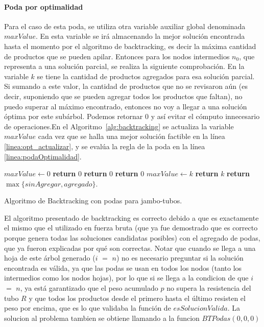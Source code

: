 \documentclass[10pt,a4paper]{article}
\begin{document}
\paragraph{Poda por optimalidad}
Para el caso de esta poda, se utiliza otra variable auxiliar global denominada $maxValue$. En esta variable se irá almacenando la mejor solución encontrada hasta el momento por el algoritmo de backtracking, es decir la máxima cantidad de productos que se pueden apilar. Entonces para los nodos intermedios $n_0$, que representa a una solución parcial, se realiza la siguiente comprobación. En la variable $k$ se tiene la cantidad de productos agregados para esa solución parcial. Si sumando a este valor, la cantidad de productos que no se revisaron aún (es decir, suponiendo que se pueden agregar todos los productos que faltan), no puedo superar al máximo encontrado, entonces no voy a llegar a una solución óptima por este subárbol. Podemos retornar 0 y así evitar el cómputo innecesario de operaciones.En el Algoritmo~\ref{alg:backtracking} se actualiza la variable $maxValue$ cada vez que se halla una mejor solución factible en la línea \ref{linea:opt_actualizar}, y se evalúa la regla de la poda en la línea \ref{linea:podaOptimalidad}.

\begin{algorithm}
\begin{algorithmic}[1]
\State $maxValue \gets 0$
   {\textbf{return} $0$}
   \EndIf \label{linea:podaFactibilidad1}
   {\textbf{return} $0$}
   \EndIf \label{linea:podaFactibilidad2}
   {\textbf{return} $0$}
   \EndIf \label{linea:podaOptimalidad}
        {$maxValue \gets k$}
        \EndIf \label{linea:opt_actualizar}
        \State \textbf{return} $k$
    \EndIf
    \State \textbf{return} $\max \{ sinAgregar,agregado \}$.
\EndFunction
\end{algorithmic}
\caption{Algoritmo de Backtracking con podas para jambo-tubos.}
\label{alg:backtracking}
\end{algorithm}

El algoritmo presentado de backtracking es correcto debido a que es exactamente el mismo que el utilizado en fuerza bruta (que ya fue demostrado que es correcto porque genera todas las soluciones candidatas posibles) con el agregado de podas, que ya fueron explicadas por qué son correctas. Notar que cuando se llega a una hoja de este árbol generado ($i$ $=$ $n$) no es necesario preguntar si la solución encontrada es válida, ya que las podas se usan en todos los nodos (tanto los intermedios como los nodos hojas), por lo que si se llega a la condicion de que $i$ $=$ $n$, ya está garantizado que el peso acumulado $p$ no supera la resistencia del tubo $R$ y que todos los productos desde el primero hasta el último resisten el peso por encima, que es lo que validaba la función de $esSolucionValida$. La solucion al problema tambien se obtiene llamando a la funcion $BTPodas(0, 0 , 0)$
\end{document}
